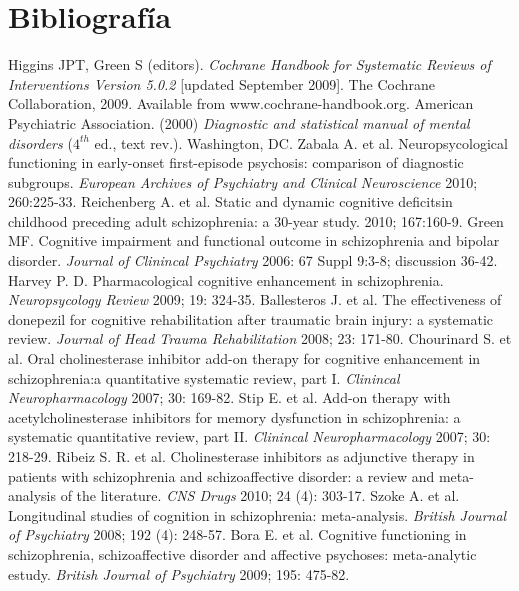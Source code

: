 \documentclass[a4paper,openright,12pt]{report}
\begin{document}
\chapter{Bibliografía}\label{cap.bibliografía}
\begin{thebibliography}{99}
 Higgins JPT, Green S (editors). \textit{Cochrane Handbook for Systematic Reviews of Interventions Version 5.0.2} [updated September 2009]. The Cochrane Collaboration, 2009. Available from www.cochrane-handbook.org.
 American Psychiatric Association. (2000) \textit{Diagnostic and statistical manual of mental disorders} ($4^{th}$ ed., text rev.). Washington, DC.
 Zabala A. et al. Neuropsycological functioning in early-onset first-episode psychosis: comparison of diagnostic subgroups. \textit{European Archives of Psychiatry and Clinical Neuroscience} 2010; 260:225-33.
 Reichenberg A. et al. Static and dynamic cognitive deficitsin childhood preceding adult schizophrenia: a 30-year study.  2010; 167:160-9.
 Green MF. Cognitive impairment and functional outcome in schizophrenia and bipolar disorder. \textit{Journal of Clinincal Psychiatry} 2006: 67 Suppl 9:3-8; discussion 36-42.
 Harvey P. D. Pharmacological cognitive enhancement in schizophrenia. \textit{Neuropsycology Review} 2009; 19: 324-35.
 Ballesteros J. et al. The effectiveness of donepezil for cognitive rehabilitation after traumatic brain injury: a systematic review. \textit{Journal of Head Trauma Rehabilitation} 2008; 23: 171-80.
 Chourinard S. et al. Oral cholinesterase inhibitor add-on therapy for cognitive enhancement in schizophrenia:a quantitative systematic review, part I. \textit{Clinincal Neuropharmacology} 2007; 30: 169-82.
 Stip E. et al. Add-on therapy with acetylcholinesterase inhibitors for memory dysfunction in schizophrenia: a systematic quantitative review, part II. \textit{Clinincal Neuropharmacology} 2007; 30: 218-29.
 Ribeiz S. R. et al. Cholinesterase inhibitors as adjunctive therapy in patients with schizophrenia and schizoaffective disorder: a review and meta-analysis of the literature. \textit{CNS Drugs}  2010; 24 (4): 303-17.
 Szoke A. et al. Longitudinal studies of cognition in schizophrenia: meta-analysis. \textit{British Journal of Psychiatry} 2008; 192 (4): 248-57.
 Bora E. et al. Cognitive functioning in schizophrenia, schizoaffective disorder and affective psychoses: meta-analytic estudy. \textit{British Journal of Psychiatry} 2009; 195: 475-82.

\end{thebibliography}
\end{document}
